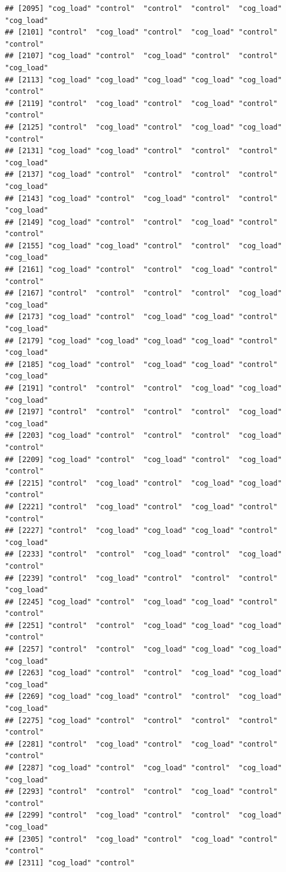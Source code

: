 \documentclass[
  american,
  man,floatsintext]{apa7}
\begin{document}
\begin{verbatim}
## [2095] "cog_load" "control"  "control"  "control"  "cog_load" "cog_load"
## [2101] "control"  "cog_load" "control"  "cog_load" "control"  "control" 
## [2107] "cog_load" "control"  "cog_load" "control"  "control"  "cog_load"
## [2113] "cog_load" "cog_load" "cog_load" "cog_load" "cog_load" "control" 
## [2119] "control"  "cog_load" "control"  "cog_load" "control"  "control" 
## [2125] "control"  "cog_load" "control"  "cog_load" "cog_load" "control" 
## [2131] "cog_load" "cog_load" "control"  "control"  "control"  "cog_load"
## [2137] "cog_load" "control"  "control"  "control"  "control"  "cog_load"
## [2143] "cog_load" "control"  "cog_load" "control"  "control"  "cog_load"
## [2149] "cog_load" "control"  "control"  "cog_load" "control"  "control" 
## [2155] "cog_load" "cog_load" "control"  "control"  "cog_load" "cog_load"
## [2161] "cog_load" "control"  "control"  "cog_load" "control"  "control" 
## [2167] "control"  "control"  "control"  "control"  "cog_load" "cog_load"
## [2173] "cog_load" "control"  "cog_load" "cog_load" "control"  "cog_load"
## [2179] "cog_load" "cog_load" "cog_load" "cog_load" "control"  "cog_load"
## [2185] "cog_load" "control"  "cog_load" "cog_load" "control"  "cog_load"
## [2191] "control"  "control"  "control"  "cog_load" "cog_load" "cog_load"
## [2197] "control"  "control"  "control"  "control"  "cog_load" "cog_load"
## [2203] "cog_load" "control"  "control"  "control"  "cog_load" "control" 
## [2209] "cog_load" "control"  "cog_load" "control"  "cog_load" "control" 
## [2215] "control"  "cog_load" "control"  "cog_load" "cog_load" "control" 
## [2221] "control"  "cog_load" "control"  "cog_load" "control"  "control" 
## [2227] "control"  "cog_load" "cog_load" "cog_load" "control"  "cog_load"
## [2233] "control"  "control"  "cog_load" "control"  "cog_load" "control" 
## [2239] "control"  "cog_load" "control"  "control"  "control"  "cog_load"
## [2245] "cog_load" "control"  "cog_load" "cog_load" "control"  "control" 
## [2251] "control"  "control"  "cog_load" "cog_load" "cog_load" "control" 
## [2257] "control"  "control"  "cog_load" "cog_load" "cog_load" "cog_load"
## [2263] "cog_load" "control"  "control"  "cog_load" "cog_load" "cog_load"
## [2269] "cog_load" "cog_load" "control"  "control"  "cog_load" "cog_load"
## [2275] "cog_load" "control"  "control"  "control"  "control"  "control" 
## [2281] "control"  "cog_load" "control"  "cog_load" "control"  "control" 
## [2287] "cog_load" "control"  "cog_load" "control"  "cog_load" "cog_load"
## [2293] "control"  "control"  "control"  "cog_load" "control"  "control" 
## [2299] "control"  "cog_load" "control"  "control"  "cog_load" "cog_load"
## [2305] "control"  "cog_load" "control"  "cog_load" "control"  "control" 
## [2311] "cog_load" "control"
\end{verbatim}
\end{document}
